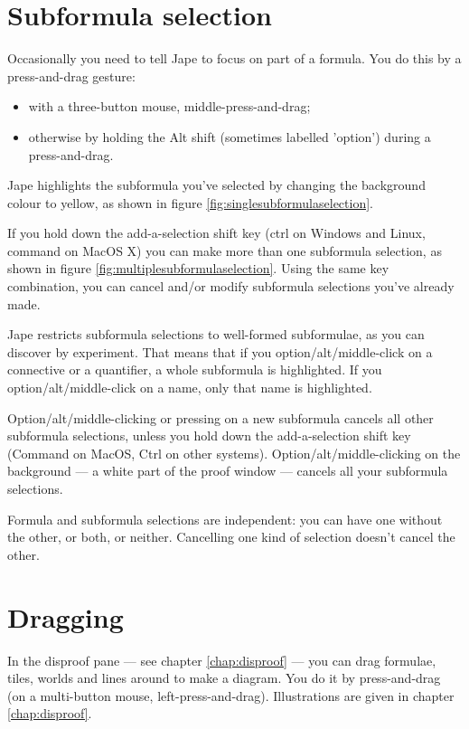 \documentclass[11pt]{book}
\newcommand{\figref}[1]{figure \ref{fig:#1}}
\newcommand{\chapref}[1]{chapter \ref{chap:#1}}
\begin{document}
\section{Subformula selection}
\label{sec:subformulaselection}

Occasionally you need to tell Jape to focus on part of a formula. You do this by a press-and-drag gesture:
\begin{itemize}
\item with a three-button mouse, middle-press-and-drag;
\item otherwise by holding the Alt shift (sometimes labelled 'option') during a press-and-drag.
\end{itemize}
Jape highlights the subformula you've selected by changing the background colour to yellow, as shown in \figref{singlesubformulaselection}. 

If you hold down the add-a-selection shift key (ctrl on Windows and Linux, command on MacOS X) you can make more than one subformula selection, as shown in \figref{multiplesubformulaselection}. Using the same key combination, you can cancel and/or modify subformula selections you've already made.

Jape restricts subformula selections to well-formed subformulae, as you can discover by experiment. That means that if you option/alt/middle-click on a connective or a quantifier, a whole subformula is highlighted. If you option/alt/middle-click on a name, only that name is highlighted.

Option/alt/middle-clicking or pressing on a new subformula cancels all other subformula selections, unless you hold down the add-a-selection shift key (Command on MacOS, Ctrl on other systems). Option/alt/middle-clicking on the background --- a white part of the proof window --- cancels all your subformula selections.

Formula and subformula selections are independent: you can have one without the other, or both, or neither. Cancelling one kind of selection doesn't cancel the other. 

\section{Dragging}

In the disproof pane --- see \chapref{disproof} --- you can drag formulae, tiles, worlds and lines around to make a diagram. You do it by press-and-drag (on a multi-button mouse, left-press-and-drag). Illustrations are given in \chapref{disproof}.
\end{document}
